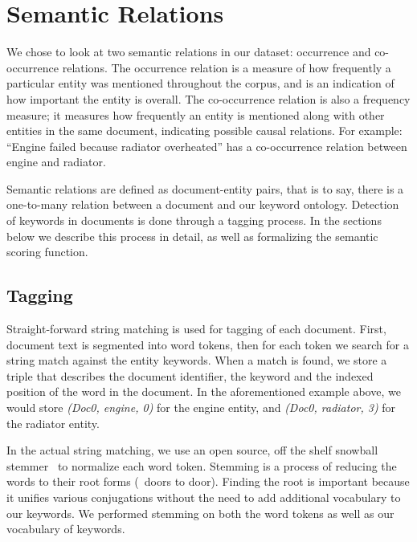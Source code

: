 \section{Semantic Relations} 
We chose to look at two semantic relations in our dataset: occurrence and
co-occurrence relations. The occurrence relation is a measure of how frequently
a particular entity was mentioned throughout the corpus, and is an
indication of how important the entity is overall. The co-occurrence relation is
also a frequency measure; it measures how frequently an entity is mentioned along
with other entities in the same document, indicating possible causal relations.
For example: ``Engine failed because radiator overheated'' has a co-occurrence
relation between engine and radiator.

Semantic relations are defined as document-entity pairs, that is to say, there
is a one-to-many relation between a document and our keyword ontology. Detection of
keywords in documents is done through a tagging process. In the sections below we
describe this process in detail, as well as formalizing the semantic scoring
function.
   

\subsection{Tagging}
Straight-forward string matching is used for tagging of each document.
First, document text is segmented into word tokens, then for each token we
search for a string match against the entity keywords. When a match is found, we
store a triple that describes the document identifier, the keyword and the
indexed position of the word in the document. In the aforementioned example
above, we would store
\emph{(Doc0, engine, 0)} for the engine entity, and \emph{(Doc0, radiator, 3)}
for the radiator entity.


In the actual string matching, we use an open source, off the shelf snowball
stemmer~\cite{snowball} to normalize each word token. 
Stemming is a process of reducing the words to their root forms (\eg~doors to door). Finding the
root is important because it unifies various conjugations without the need to
add additional vocabulary to our keywords. We performed stemming on both the
word tokens as well as our vocabulary of keywords.

